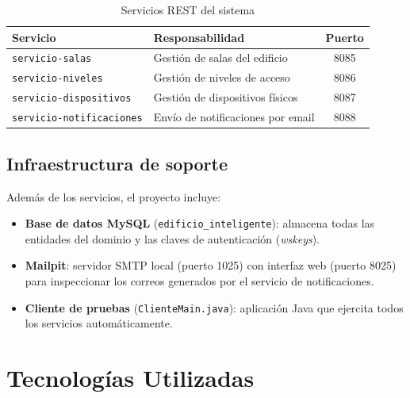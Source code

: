 \documentclass[12pt, a4paper]{article}
\begin{document}
\begin{table}[H]
  \centering
  \begin{tabular}{llc}
    \toprule
    \textbf{Servicio} & \textbf{Responsabilidad} & \textbf{Puerto} \\
    \midrule
    \texttt{servicio-salas}         & Gestión de salas del edificio   & 8085 \\
    \texttt{servicio-niveles}       & Gestión de niveles de acceso    & 8086 \\
    \texttt{servicio-dispositivos}  & Gestión de dispositivos físicos & 8087 \\
    \texttt{servicio-notificaciones}& Envío de notificaciones por email & 8088 \\
    \bottomrule
  \end{tabular}
  \caption{Servicios REST del sistema}
\end{table}

\subsection{Infraestructura de soporte}

Además de los servicios, el proyecto incluye:

\begin{itemize}
  \item \textbf{Base de datos MySQL} (\texttt{edificio\_inteligente}): almacena todas las entidades del dominio y las claves de autenticación (\textit{wskeys}).
  \item \textbf{Mailpit}: servidor SMTP local (puerto 1025) con interfaz web (puerto 8025) para inspeccionar los correos generados por el servicio de notificaciones.
  \item \textbf{Cliente de pruebas} (\texttt{ClienteMain.java}): aplicación Java que ejercita todos los servicios automáticamente.
\end{itemize}

\section{Tecnologías Utilizadas}
\end{document}

